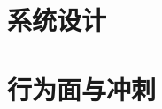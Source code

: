 \documentclass[11pt, a4paper, openany]{book}
\begin{document}
\part{系统设计}






\part{行为面与冲刺}


\end{document}
